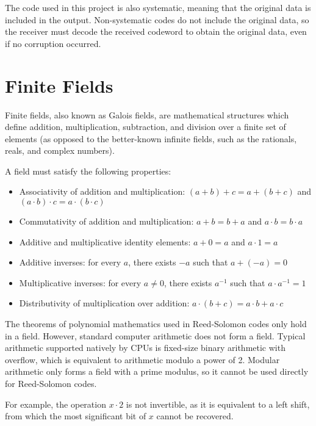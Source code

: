 The code used in this project is also systematic, meaning that the original data is included in the output.
Non-systematic codes do not include the original data, so the receiver must decode the received codeword to obtain the original data, even if no corruption occurred.

\section{Finite Fields}

Finite fields, also known as Galois fields, are mathematical structures which define addition, multiplication, subtraction, and division over a finite set of elements \cite{finite-fields-2nd-ed}
(as opposed to the better-known infinite fields, such as the rationals, reals, and complex numbers).

A field must satisfy the following properties:

\begin{itemize}[nosep]
    \item Associativity of addition and multiplication: $(a + b) + c = a + (b + c)$ and $(a \cdot b) \cdot c = a \cdot (b \cdot c)$
    \item Commutativity of addition and multiplication: $a + b = b + a$ and $a \cdot b = b \cdot a$
    \item Additive and multiplicative identity elements: $a + 0 = a$ and $a \cdot 1 = a$
    \item Additive inverses: for every $a$, there exists $-a$ such that $a + (-a) = 0$
    \item Multiplicative inverses: for every $a \neq 0$, there exists $a^{-1}$ such that $a \cdot a^{-1} = 1$
    \item Distributivity of multiplication over addition: $a \cdot (b + c) = a \cdot b + a \cdot c$
\end{itemize}

The theorems of polynomial mathematics used in Reed-Solomon codes only hold in a field. However, standard computer arithmetic does not form a field.
Typical arithmetic supported natively by CPUs is fixed-size binary arithmetic with overflow, which is equivalent to arithmetic modulo a power of 2.
Modular arithmetic only forms a field with a prime modulus, so it cannot be used directly for Reed-Solomon codes.

For example, the operation $x \cdot 2$ is not invertible, as it is equivalent to a left shift, from which the most significant bit of $x$ cannot be recovered.

